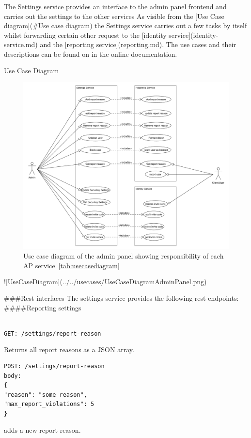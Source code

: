 The Settings service provides an interface to the admin panel frontend and carries out the settings to the other services
As visible from the [Use Case diagram](#Use case diagram) the Settings service carries out a few tasks by itself whilst forwarding certain other request to the [identity service](identity-service.md) and the [reporting service](reporting.md).
The use cases and their descriptions can be found on in the online documentation.

Use Case Diagram
\begin{figure}[!ht]
    \centering
    \includegraphics[width=1.0\textwidth]{./images/UseCaseDiagramAdminPanel.pdf}
    \caption{Use case diagram of the admin panel showing responsibility of each AP service~\ref{tab:usecasediagram}}
    \label{fig:ucd}
\end{figure}
![UseCaseDiagram](../../usecases/UseCaseDiagramAdminPanel.png)

###Rest interfaces
The settings service provides the following rest endpoints:
####Reporting settings
\begin{verbatim}

GET: /settings/report-reason
\end{verbatim}
Returns all report reasons as a JSON array.

\begin{verbatim}
POST: /settings/report-reason
body:
{
"reason": "some reason",
"max_report_violations": 5
}
\end{verbatim}
adds a new report reason.

